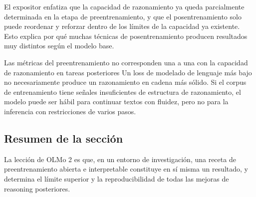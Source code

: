 El expositor enfatiza que la capacidad de razonamiento ya queda parcialmente determinada en la etapa de preentrenamiento, y que el posentrenamiento solo puede reordenar y reforzar dentro de los límites de la capacidad ya existente. Esto explica por qué muchas técnicas de posentrenamiento producen resultados muy distintos según el modelo base.

\begin{warningbox}{Las métricas del preentrenamiento no corresponden una a una con la capacidad de razonamiento en tareas posteriores}
Un loss de modelado de lenguaje más bajo no necesariamente produce un razonamiento en cadena más sólido. Si el corpus de entrenamiento tiene señales insuficientes de estructura de razonamiento, el modelo puede ser hábil para continuar textos con fluidez, pero no para la inferencia con restricciones de varios pasos.
\end{warningbox}

\subsection{Resumen de la sección}
La lección de OLMo 2 es que, en un entorno de investigación, una receta de preentrenamiento abierta e interpretable constituye en sí misma un resultado, y determina el límite superior y la reproducibilidad de todas las mejoras de reasoning posteriores.


